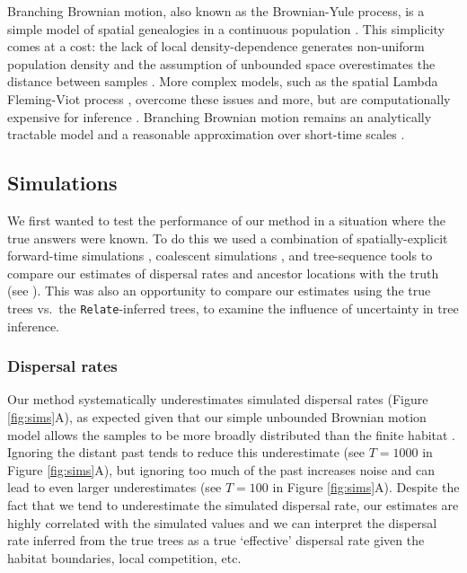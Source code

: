 \documentclass[12pt]{article}
\begin{document}
Branching Brownian motion, also known as the Brownian-Yule process, is a simple model of spatial genealogies in a continuous population \citep{malecot1948mathematics,wright1943isolation}. This simplicity comes at a cost: the lack of local density-dependence generates non-uniform population density \citep{felsenstein1975pain} and the assumption of unbounded space overestimates the distance between samples \citep{kalkauskas2021sampling}. More complex models, such as the spatial Lambda Fleming-Viot process \citep{barton2010new}, overcome these issues and more, but are computationally expensive for inference \citep{wirtz2023connections}. Branching Brownian motion remains an analytically tractable model and a reasonable approximation over short-time scales \citep{edwards1970estimation,rannala1996probability,meligkotsidou2007postprocessing,novembre2009likelihood}.

\subsection*{Simulations}

We first wanted to test the performance of our method in a situation where the true answers were known. To do this we used a combination of spatially-explicit forward-time simulations \citep{haller2023slim}, coalescent simulations \citep{kelleher2016efficient}, and tree-sequence tools \citep{haller2019tree,kelleher2019inferring,speidel2019method} to compare our estimates of dispersal rates and ancestor locations with the truth (see ). This was also an opportunity to compare our estimates using the true trees vs.\ the \texttt{Relate}-inferred trees, to examine the influence of uncertainty in tree inference.

\subsubsection*{Dispersal rates}

Our method systematically underestimates simulated dispersal rates (Figure \ref{fig:sims}A), as expected given that our simple unbounded Brownian motion model allows the samples to be more broadly distributed than the finite habitat \citep[e.g.,][]{ianni2023exploring,kalkauskas2021sampling}. Ignoring the distant past tends to reduce this underestimate (see $T=1000$ in Figure \ref{fig:sims}A), but ignoring too much of the past increases noise and can lead to even larger underestimates (see $T=100$ in Figure \ref{fig:sims}A). Despite the fact that we tend to underestimate the simulated dispersal rate, our estimates are highly correlated with the simulated values and we can interpret the dispersal rate inferred from the true trees as a true `effective' dispersal rate given the habitat boundaries, local competition, etc. 
\end{document}
